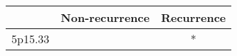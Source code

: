 \begin{tabular}{lcc}
\toprule
{} & Non-recurrence & Recurrence \\
\midrule
5p15.33 &                &          * \\
\bottomrule
\end{tabular}
